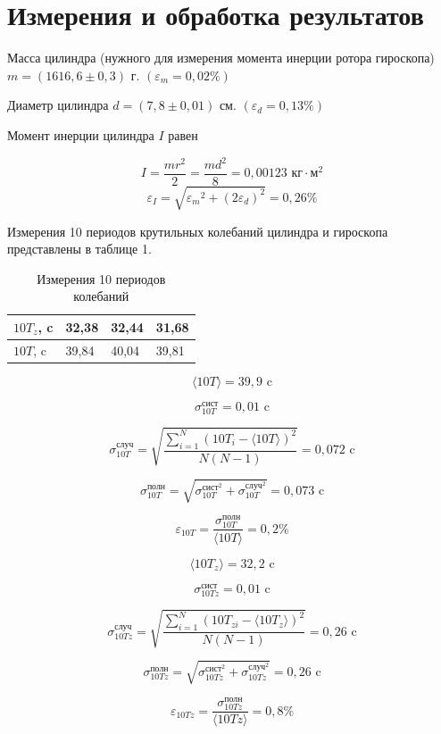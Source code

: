 \documentclass[a4paper, 12pt]{article}
\begin{document}
\section*{Измерения и обработка результатов}
Масса цилиндра (нужного для измерения момента инерции ротора гироскопа) $m = (1616,6 \pm 0,3)$ г. $(\varepsilon_m = 0,02\%)$

Диаметр цилиндра $d = (7,8 \pm 0,01)$ см. $(\varepsilon_d = 0,13\%)$

Момент инерции цилиндра $I$ равен 

\[I = \frac{mr^2}{2} = \frac{md^2}{8} = 0,00123 \text{ кг$\cdot$м$^2$}\]
\[ \varepsilon_I = \sqrt{{\varepsilon_m}^2 + (2\varepsilon_d)^2} = 0,26\%\]

Измерения 10 периодов крутильных колебаний цилиндра и гироскопа представлены в таблице 1.
\begin{table}[ht]
    \centering
    \begin{tabular}{|l|l|l|l|}
    \hline
        $10T_z$, c & 32,38 & 32,44 & 31,68 \\ \hline
        $10T$, c & 39,84 & 40,04 & 39,81 \\ \hline
    \end{tabular}
    \caption{Измерения 10 периодов колебаний}
\end{table}

\[ \langle 10T \rangle = 39,9 \text{ c}\]

\[ \sigma_{10T}^{\text{сист}} = 0,01 \text{ c}\]

\[ \sigma_{10T}^{\text{случ}} = \sqrt{\frac{\sum_{i=1}^{N}(10T_i-\langle 10T \rangle)^2}{N(N-1)}} = 0,072 \text{ c}\]

\[ \sigma_{10T}^{\text{полн}} = \sqrt{\sigma_{10T}^{{\text{сист}}^2}+\sigma_{10T}^{{\text{случ}}^2}} = 0,073 \text{ c}\]

\[ \varepsilon_{10T} = \frac{\sigma_{10T}^{\text{полн}}}{\langle 10T \rangle} = 0,2\%\]


\[ \langle 10T_z \rangle = 32,2 \text{ c}\]

\[ \sigma_{10Tz}^{\text{сист}} = 0,01 \text{ c}\]

\[ \sigma_{10Tz}^{\text{случ}} = \sqrt{\frac{\sum_{i=1}^{N}(10T_{zi}-\langle 10T_z \rangle)^2}{N(N-1)}} = 0,26 \text{ c}\]

\[ \sigma_{10Tz}^{\text{полн}} = \sqrt{\sigma_{10Tz}^{{\text{сист}}^2}+\sigma_{10Tz}^{{\text{случ}}^2}} = 0,26 \text{ c}\]

\[ \varepsilon_{10Tz} = \frac{\sigma_{10Tz}^{\text{полн}}}{\langle 10Tz \rangle} = 0,8\%\]
\end{document}
